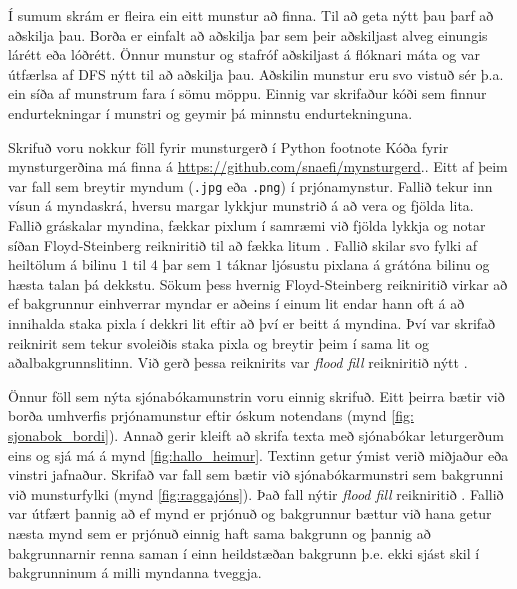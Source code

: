Í sumum skrám er fleira ein eitt munstur að finna. Til að geta nýtt þau þarf að aðskilja þau. Borða er einfalt að aðskilja þar sem þeir aðskiljast alveg einungis lárétt eða lóðrétt. Önnur munstur og stafróf aðskiljast á flóknari máta og var útfærlsa af DFS nýtt til að aðskilja þau. Aðskilin munstur eru svo vistuð sér þ.a. ein síða af munstrum fara í sömu möppu. Einnig var skrifaður kóði sem finnur endurtekningar í munstri og geymir þá minnstu endurtekninguna.

Skrifuð voru nokkur föll fyrir munsturgerð í Python footnote {Kóða fyrir mynsturgerðina má finna á \url{https://github.com/snaefi/mynsturgerd}.}. Eitt af þeim var fall sem breytir myndum (\texttt{.jpg} eða \texttt{.png}) í prjónamynstur. Fallið tekur inn vísun á myndaskrá, hversu margar lykkjur munstrið á að vera og fjölda lita. Fallið gráskalar myndina, fækkar pixlum í samræmi við fjölda lykkja og notar síðan Floyd-Steinberg reikniritið til að fækka litum \cite{FloydSteinberg}. Fallið skilar svo fylki af heiltölum á bilinu $1$ til $4$ þar sem $1$ táknar ljósustu pixlana á grátóna bilinu og hæsta talan þá dekkstu. Sökum þess hvernig Floyd-Steinberg reikniritið virkar að ef bakgrunnur einhverrar myndar er aðeins í einum lit endar hann oft á að innihalda staka pixla í dekkri lit eftir að því er beitt á myndina. Því var skrifað reiknirit sem tekur svoleiðis staka pixla og breytir þeim í sama lit og aðalbakgrunnslitinn. Við gerð þessa reiknirits var \textit{flood fill} reikniritið nýtt \cite{flood-fill}.

Önnur föll sem nýta sjónabókamunstrin voru einnig skrifuð. Eitt þeirra bætir við borða umhverfis prjónamunstur eftir óskum notendans (mynd \ref{fig: sjonabok_bordi}). Annað gerir kleift að skrifa texta með sjónabókar leturgerðum eins og sjá má á mynd \ref{fig:hallo_heimur}. Textinn getur ýmist verið  miðjaður eða vinstri jafnaður. Skrifað var fall sem bætir við sjónabókarmunstri sem bakgrunni við munsturfylki (mynd \ref{fig:raggajóns}). Það fall nýtir \textit{flood fill} reikniritið \cite{flood-fill}. Fallið var útfært þannig að ef mynd er prjónuð og bakgrunnur bættur við hana getur næsta mynd sem er prjónuð einnig haft sama bakgrunn og þannig að bakgrunnarnir renna saman í einn heildstæðan bakgrunn þ.e. ekki sjást skil í bakgrunninum á milli myndanna tveggja.

